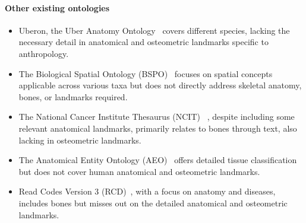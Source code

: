 \documentclass[sw]{iosart2x}
\begin{document}
\paragraph{Other existing ontologies}\label{sec:otherontologies}
\begin{itemize}
\item Uberon, the Uber Anatomy Ontology~\citep{uberon} covers different species, lacking the necessary detail in anatomical and osteometric landmarks specific to anthropology.
\item The Biological Spatial Ontology (BSPO)~\citep{bspo} focuses on spatial concepts applicable across various taxa but does not directly address skeletal anatomy, bones, or landmarks required.
\item The National Cancer Institute Thesaurus (NCIT) ~\citep{ncit}, despite including some relevant anatomical landmarks, primarily relates to bones through text, also lacking in osteometric landmarks.
\item The Anatomical Entity Ontology (AEO)~\citep{aeo} offers detailed tissue classification but does not cover human anatomical and osteometric landmarks.
\item Read Codes Version 3 (RCD)~\citep{rcd}, with a focus on anatomy and diseases, includes bones but misses out on the detailed anatomical and osteometric landmarks.
\end{itemize}
\end{document}
